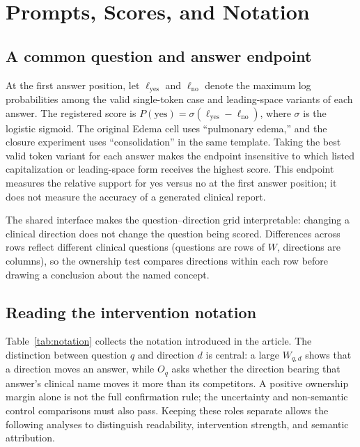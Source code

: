 \section{Prompts, Scores, and Notation}
\label{app:protocol}

\subsection{A common question and answer endpoint}

At the first answer position, let $\ell_{\mathrm{yes}}$ and
$\ell_{\mathrm{no}}$ denote the maximum log probabilities among the valid
single-token case and leading-space variants of each answer.  The registered
score is $P(\mathrm{yes})=\sigma(\ell_{\mathrm{yes}}-\ell_{\mathrm{no}})$,
where $\sigma$ is the logistic sigmoid. The original Edema cell uses ``pulmonary
edema,'' and the closure experiment uses ``consolidation'' in the same
template. Taking the best valid token variant for each answer makes the
endpoint insensitive to which listed capitalization or leading-space form
receives the highest score. This endpoint measures the relative support for
yes versus no at the first answer position; it does not measure the accuracy
of a generated clinical report.


The shared interface makes the question--direction grid interpretable:
changing a clinical direction does not change the question being scored.
Differences across rows reflect different clinical questions (questions are
rows of $W$, directions are columns), so the ownership test compares directions
within each row before drawing a conclusion about the named concept.

\subsection{Reading the intervention notation}

Table~\ref{tab:notation} collects the notation introduced in the article.
The distinction between question $q$ and direction $d$ is central: a large
$W_{q,d}$ shows that a direction moves an answer, while $O_q$ asks whether
the direction bearing that answer's clinical name moves it more than its
competitors. A positive ownership margin alone is not the full confirmation
rule; the uncertainty and non-semantic control comparisons must also pass.
Keeping these roles separate allows the following analyses to distinguish
readability, intervention strength, and semantic attribution.

